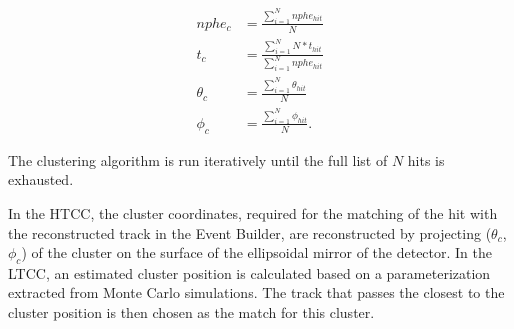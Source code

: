 \begin{eqnarray}
nphe_c &= \frac{\sum_{i=1}^N{nphe_{hit}}}{N} \nonumber \\
t_c &= \frac{\sum_{i=1}^N{N*t_{hit}}}{\sum_{i=1}^N{nphe_{hit}}} \nonumber \\
\theta_c &=\frac{\sum_{i=1}^N{\theta_{hit}}}{N} \nonumber \\
\phi_c &= \frac{\sum_{i=1}^N{\phi_{hit}}}{N}.
\end{eqnarray}

\noindent
The clustering algorithm is run iteratively until the full list of $N$ hits is exhausted.

In the HTCC, the cluster coordinates, required for the matching of the hit with the reconstructed track in the
Event Builder, are reconstructed by projecting  ($\theta_c$, $\phi_c$) of the cluster on the surface of the
ellipsoidal mirror of the detector. In the LTCC, an estimated cluster position is calculated based on a
parameterization extracted from Monte Carlo simulations. The track that passes the closest to the cluster
position is then chosen as the match for this cluster.
